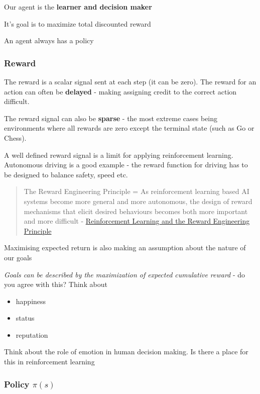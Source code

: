 \documentclass[]{article}
\providecommand{\tightlist}{%
  \setlength{\itemsep}{0pt}\setlength{\parskip}{0pt}}
\begin{document}
Our agent is the \textbf{learner and decision maker}

It's goal is to maximize total discounted reward

An agent always has a policy

\hypertarget{reward}{%
\subsubsection{Reward}\label{reward}}

The reward is a scalar signal sent at each step (it can be zero). The
reward for an action can often be \textbf{delayed} - making assigning
credit to the correct action difficult.

The reward signal can also be \textbf{sparse} - the most extreme cases
being environments where all rewards are zero except the terminal state
(such as Go or Chess).

A well defined reward signal is a limit for applying reinforcement
learning. Autonomous driving is a good example - the reward function for
driving has to be designed to balance safety, speed etc.

\begin{quote}
The Reward Engineering Principle = As reinforcement learning based AI
systems become more general and more autonomous, the design of reward
mechanisms that elicit desired behaviours becomes both more important
and more difficult -
\href{http://www.danieldewey.net/reward-engineering-principle.pdf}{Reinforcement
Learning and the Reward Engineering Principle}
\end{quote}

Maximising expected return is also making an assumption about the nature
of our goals

\emph{Goals can be described by the maximization of expected cumulative
reward} - do you agree with this? Think about

\begin{itemize}
\tightlist
\item
  happiness
\item
  status
\item
  reputation
\end{itemize}

Think about the role of emotion in human decision making. Is there a
place for this in reinforcement learning

\hypertarget{policy-pis}{%
\subsubsection{\texorpdfstring{Policy
\(\pi(s)\)}{Policy \textbackslash{}pi(s)}}\label{policy-pis}}
\end{document}
